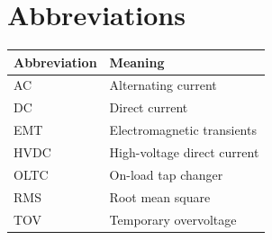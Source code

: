 \chapter*{Abbreviations}
\begin{longtable}{@{}lp{}@{}}
\toprule
Abbreviation & Meaning \\
\midrule
AC & Alternating current \\
DC & Direct current \\
EMT & Electromagnetic transients \\
HVDC & High-voltage direct current \\
OLTC & On-load tap changer \\
RMS & Root mean square \\
TOV & Temporary overvoltage \\
\bottomrule
\end{longtable}
\cleardoublepage
